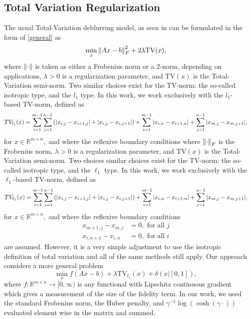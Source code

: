 \documentclass[10pt,a4paper]{article}
\newcommand{\R}{\mathbb{R}}
\begin{document}
\subsection{Total Variation Regularization}
The usual Total-Variation deblurring model, as seen in \cite{TV} can be formulated in the form of \eqref{general} as 
\begin{equation} \label{tv_orig}
\min_{x} \norm{ Ax - b }_F^2 + 2 \lambda \mathrm{TV}(x),
\end{equation}
where $\norm{\cdot}$ is taken as either a Frobenius norm or a 2-norm, depending on applications,  $\lambda>0$ is a regularization parameter, and $\mathrm{TV}(x)$ is the Total-Variation semi-norm. Two similar choices exist for the TV-norm: the so-called isotropic type, and the $l_1$ type.  In this work, we work exclusively with the $l_1$-based TV-norm, defined as 
$$ TV_{l_1}(x) = \sum_{i=1}^{m-1} \sum_{j=1}^{n-1} \left( \abs{x_{i,j}  - x_{i+1,j} } + \abs{ x_{i,j} - x_{i,j+1}  } \right) + \sum_{i=1}^{m-1} \abs{ x_{i,n} - x_{i+1,n} } + \sum_{j=1}^{n-1} \abs{ x_{m,j} - x_{m,j+1 } },$$ for $x \in \R^{m \times n},$ and where the reflexive boundary conditions where $\norm{\cdot}_F$ is the Frobenius norm, $\lambda>0$ is a regularization parameter, and $\mathrm{TV}(x)$ is the Total-Variation semi-norm. Two choices similar choices exist for the TV-norm: the so-called isotropic type, and the $\ell_1$ type. In this work, we work exclusively with the $\ell_1$-based TV-norm, defined as 
$$ TV_{\ell_1}(x) = \sum_{i=1}^{m-1} \sum_{j=1}^{n-1} \left( \abs{x_{i,j}  - x_{i+1,j} } + \abs{ x_{i,j} - x_{i,j+1}  } \right) + \sum_{i=1}^{m-1} \abs{ x_{i,n} - x_{i+1,n} } + \sum_{j=1}^{n-1} \abs{ x_{m,j} - x_{m,j+1 } },$$ for $x \in \R^{m \times n},$ and where the reflexive boundary conditions
\begin{align*}
x_{m+1,j} - x_{m,j} &= 0, \textrm{ for all }j \\
 x_{i,n+1} - x_{i,n} &= 0, \textrm{ for all }i
\end{align*}
are assumed.  However, it is a very simple adjustment to use the isotropic definition of total variation and all of the same methods still apply. Our approach considers a more general problem
\begin{equation} \label{tv_ours}
\min_{x} f(Ax - b ) + \lambda \mathrm{TV}_{l_1}(x) + \delta(x | [0,1]),
\end{equation}
where $f: \R^{m \times n} \rightarrow [0,\infty)$ is any functional with Lipschitz continuous gradient which gives a measurement of the size of the fidelity term.  In our work, we used the standard Frobenius norm, the Huber penalty, and $\gamma^{-1}\log( \cosh (\gamma \cdot ))$ evaluated element wise in the matrix and summed.\\
\end{document}
